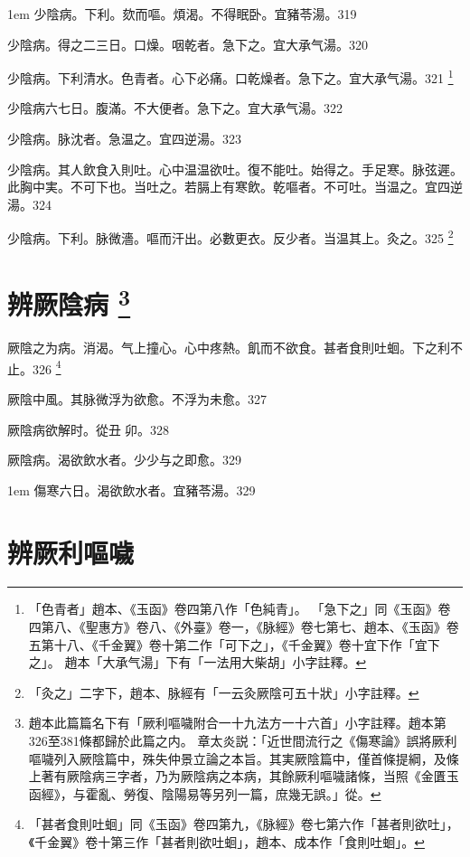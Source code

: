 \hangindent 1em
少陰病。下利。欬而嘔。煩渴。不得眠卧。宜豬苓湯。{\shenghui}319

少陰病。得之二三日。口燥。咽乾者。急下之。宜{\khaai 大}承气湯。320

少陰病。{\khaai 下}利清水。色青者。心下必痛。口乾燥者。急下之。宜{\khaai 大}承气湯。321
	\footnote{
		「色青者」趙本、《玉函》卷四第八作「色純青」。
		「急下之」同《玉函》卷四第八、《聖惠方》卷八、《外臺》卷一，《脉經》卷七第七、趙本、《玉函》卷五第十八、《千金翼》卷十第二作「可下之」，《千金翼》卷十宜下作「宜下之」。
		趙本「大承气湯」下有「一法用大柴胡」小字註釋。
	}

少陰病六七日。腹滿。不大便者。急下之。宜{\khaai 大}承气湯。322

少陰病。脉沈者。急温之。宜四逆湯。323

少陰病。其人飲食入則吐。心中温温欲吐。復不能吐。始得之。手足寒。脉弦遲。此胸中実。不可下也。当吐之。若膈上有寒飲。乾嘔者。不可吐。当温之。宜四逆湯。324

少陰病。下利。脉微濇。嘔而汗出。必數更衣。反少者。当温其上。灸之。325
	\footnote{
		「灸之」二字下，趙本、脉經有「一云灸厥陰可五十狀」小字註釋。
	}

\chapter{辨厥陰病
	\footnote{
		趙本此篇篇名下有「厥利嘔噦附合一十九法方一十六首」小字註釋。趙本第326至381條都歸於此篇之内。
		章太炎説：「近世間流行之《傷寒論》誤將厥利嘔噦列入厥陰篇中，殊失仲景立論之本旨。其実厥陰篇中，僅首條提綱，及條上著有厥陰病三字者，乃为厥陰病之本病，其餘厥利嘔噦諸條，当照《金匱玉函經》，与霍亂、勞復、陰陽易等另列一篇，庶幾无誤。」從。
	}
}

厥陰之为病。消渴。气上撞心。心中疼熱。飢而不欲食。{\khaai 甚者}食則吐{\khaai 蛔}。下之利不止。326
	\footnote{
		「甚者食則吐蛔」同《玉函》卷四第九，《脉經》卷七第六作「甚者則欲吐」，《千金翼》卷十第三作「甚者則欲吐蛔」，趙本、成本作「食則吐蛔」。
	}

厥陰中風。其脉微浮为欲愈。不浮为未愈。327

厥陰病欲解时。從丑{\sungii 𥁞}卯。328

厥陰病。渴欲飲水者。少少与之即愈。329

\hangindent 1em
傷寒六日。渴欲飲水者。宜豬苓湯。{\shenghui}329

\chapter{辨厥利嘔噦}

